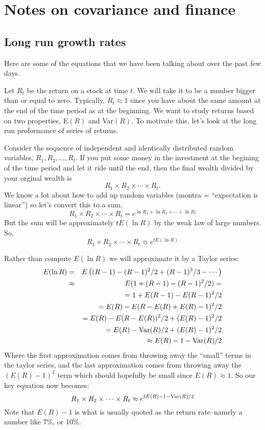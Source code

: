 \documentclass{article}
\begin{document}
\section*{Notes on covariance and finance}

\subsection*{Long run growth rates}

Here are some of the equations that we have been talking about over
the past few days.

Let $R_t$ be the return on a stock at time $t$.  We will take it to be
a number bigger than or equal to zero.  Typically, $R_t \approx 1$
since you have about the same amount at the end of the time period as
at the beginning.  We want to study returns based on two properties,
E$(R)$ and Var$(R)$.  To motivate this, let's look at the long run
proformance of series of returns.

Consider the sequence of independent and identically distributed
random variables, $R_1, R_2, \ldots, R_t$.  If you put some money in
the investment at the begining of the time period and let it ride
until the end, then the final wealth divided by your orginal wealth
is 
$$R_1 \times R_2 \times \cdots \times R_t.$$
We know a lot about how to add up random variables (montra =
``expectation is linear'') so let's convert this to a sum.
$$R_1 \times R_2 \times \cdots \times R_t = e^{\ln R_1 + \ln R_2 +
\cdots + \ln R_t}$$
But the sum will be approximately $t E(\ln R)$ by the weak law of
large numbers.  So,
$$R_1 \times R_2 \times \cdots \times R_t \approx e^{t E(\ln R)}$$

Rather than compute $E(\ln R)$ we will approximate it by a Taylor
series: 
\begin{eqnarray*}
E(\ln R) &= &E\left((R-1) - (R-1)^2/2 + (R-1)^3/3 - \cdots \right)\\
&\approx& E(1 + (R-1) - (R-1)^2/2) =\\
&& = 1 + E(R-1) - E(R-1)^2/2 \\
&& = E(R) - E(R- E(R) + E(R) - 1)^2/2 \\
&& = E(R) - E(R- E(R))^2/2  + (E(R) - 1)^2/2 \\
&& = E(R) - \hbox{Var}(R)/2  + (E(R) - 1)^2/2 \\
&& \approx E(R) - 1  - \hbox{Var}(R)/2
\end{eqnarray*}
Where the first approximation comes from throwing away the ``small''
terms in the taylor series, and the last approximation comes from
throwing away the $ (E(R) - 1)^2$ term which should hopefully be small
since $E(R) \approx 1$.  So our key equation now becomes:
$$R_1 \times R_2 \times \cdots \times R_t \approx e^{t E(R) -1 -
\hbox{\scriptsize Var}(R)/2}$$ 
Note that $E(R) - 1$ is what is usually quoted as the return
rate--namely a number like 7\%, or 10\%.
\end{document}
